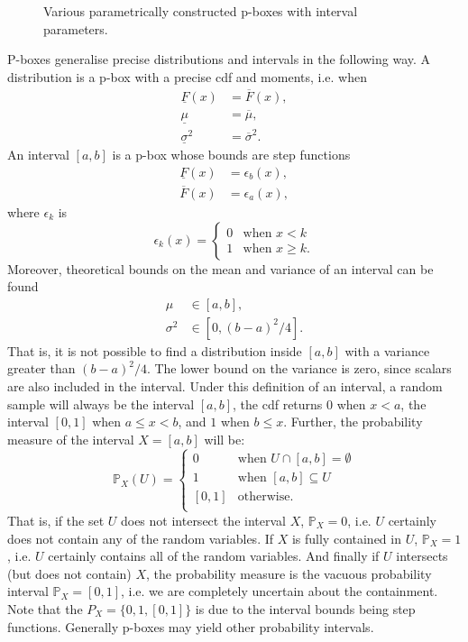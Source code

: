 \documentclass{juliacon}
\begin{document}
\begin{figure}[htp]
  \caption{Various parametrically constructed p-boxes with interval parameters.}
  \label{fig:figure3}
\end{figure}
P-boxes generalise precise distributions and intervals in the following way. A distribution is a p-box with a precise cdf and moments, i.e. when
\begin{align*}
  \underline{F}(x) &= \overline{F}(x), \\ 
  \underline{\mu}  &= \overline{\mu}, \\ 
  \underline{\sigma}^2 &= \overline{\sigma}^2 .
\end{align*}
\noindent An interval $[a,b]$ is a p-box whose bounds are step functions
\begin{align*}
    \underline{F}(x) &= \epsilon_{b}(x) ,\\
    \overline{F}(x) &= \epsilon_{a}(x) ,
\end{align*}
\noindent where $\epsilon_k$ is
\begin{equation*}
   \epsilon_k(x) = \begin{cases} 0 &\text{when } x < k \\ 1 &\text{when } x \geq k. \end{cases} 
\end{equation*}
\noindent Moreover, theoretical bounds on the mean and variance of an interval can be found \cite{ferson2002ramas}
\begin{align*}
  \mu &\in [a, b], \\
  \sigma^2 &\in [0, (b - a)^{2}/4].
\end{align*}
\noindent That is, it is not possible to find a distribution inside $[a, b]$ with a variance greater than $(b-a)^{2}/4$. The lower bound on the variance is zero, since scalars are also included in the interval. Under this definition of an interval, a random sample will always be the interval $[a, b]$, the cdf returns 0 when $x < a$, the interval $[0,1]$ when $a \leq x < b$, and $1$ when $b \leq x$. Further, the probability measure of the interval $X = [a, b]$ will be: 
\begin{equation*}
  \mathbb{P}_{X}(U) = \begin{cases}
    0 & \text{when } U \cap [a,b] = \emptyset \\
    1 & \text{when } [a,b] \subseteq U  \\
    [0, 1] & \text{otherwise.}\\
  \end{cases}
\end{equation*}
\noindent That is, if the set $U$ does not intersect the interval $X$, $\mathbb{P}_{X}=0$, i.e. $U$ certainly does not contain any of the random variables. If $X$ is fully contained in $U$, $\mathbb{P}_{X}=1$, i.e. $U$ certainly contains all of the random variables. And finally if $U$ intersects (but does not contain) $X$, the probability measure is the vacuous probability interval $\mathbb{P}_{X} = [0, 1]$, i.e. we are completely uncertain about the containment. Note that the $P_{X} = \{0, 1, [0,1]\}$ is due to the interval bounds being step functions. Generally p-boxes may yield other probability intervals.
\end{document}
